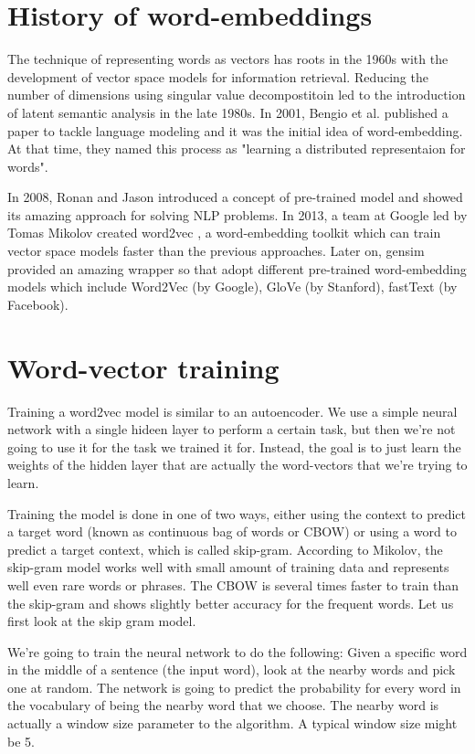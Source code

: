 \section{History of word-embeddings}

The technique of representing words as vectors has roots in the 1960s with the development of vector space models for information retrieval. Reducing the number of dimensions using singular value decompostitoin led to the introduction of latent semantic analysis in the late 1980s. In 2001, Bengio et al. \cite{bengio2003neural} published a paper to tackle language modeling and it was the initial idea of word-embedding. At that time, they named this process as "learning a distributed representaion for words".

In 2008, Ronan and Jason \cite{collobert2008unified} introduced a concept of pre-trained model and showed its amazing approach for solving NLP problems. In 2013, a team at Google led by Tomas Mikolov created word2vec \cite{mikolov2013efficient}, a word-embedding toolkit which can train vector space models faster than the previous approaches. Later on, gensim provided an amazing wrapper so that adopt different pre-trained word-embedding models which include Word2Vec (by Google), GloVe \cite{pennington2014glove} (by Stanford), fastText (by Facebook).

\section{Word-vector training}

Training a word2vec model is similar to an autoencoder. We use a simple neural network with a single hideen layer to perform a certain task, but then we're not going to use it for the task we trained it for. Instead, the goal is to just learn the weights of the hidden layer that are actually the word-vectors that we're trying to learn.

Training the model is done in one of two ways, either using the context to predict a target word (known as continuous bag of words or CBOW) or using a word to predict a target context, which is called skip-gram. According to Mikolov, the skip-gram model works well with small amount of training data and represents well even rare words or phrases. The CBOW is several times faster to train than the skip-gram and shows slightly better accuracy for the frequent words. Let us first look at the skip gram model.

We're going to train the neural network to do the following: Given a specific word in the middle of a sentence (the input word), look at the nearby words and pick one at random. The network is going to predict the probability for every word in the vocabulary of being the nearby word that we choose. The nearby word is actually a window size parameter to the algorithm. A typical window size might be 5.

